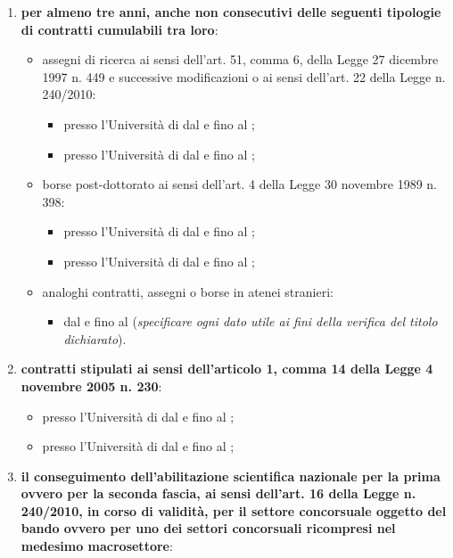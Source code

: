 \documentclass[a4paper,10pt]{article}
\begin{document}
\begin{Form}
\begin{enumerate}
\item \textbf{per almeno tre anni, anche non consecutivi delle seguenti tipologie 
di contratti cumulabili tra loro}:
\begin{itemize}
\item assegni di ricerca ai sensi dell’art. 51, comma 6, della Legge 27 dicembre
 1997 n. 449 e successive modificazioni o ai sensi dell’art. 22 della Legge n. 240/2010:
\begin{itemize}
 \item presso l’Università di \myTextField[4.5cm]{} dal \myTextField{} e fino 
 al \myTextField{};
 \item presso l’Università di \myTextField[4.5cm]{} dal \myTextField{} e fino 
 al \myTextField{};
\end{itemize}
\item borse post-dottorato ai sensi dell’art. 4 della Legge 30 novembre 1989 
n. 398:
\begin{itemize}
 \item presso l’Università di \myTextField[4.5cm]{} dal \myTextField{} e fino 
 al \myTextField{};
 \item presso l’Università di \myTextField[4.5cm]{} dal \myTextField{} e fino 
 al \myTextField{};
\end{itemize}
\item analoghi contratti, assegni o borse in atenei stranieri:
\begin{itemize}
\item dal \myTextField{} e fino al \myTextField{} (\emph{specificare ogni dato 
utile ai fini della verifica del titolo dichiarato}).
\end{itemize}
\end{itemize}
\item \textbf{contratti stipulati ai sensi dell’articolo 1, comma 14 della 
Legge 4 novembre 2005 n. 230}:
\begin{itemize}
 \item presso l’Università di \myTextField[4.5cm]{} dal \myTextField{} e fino 
 al \myTextField{};
 \item presso l’Università di \myTextField[4.5cm]{} dal \myTextField{} e fino 
 al \myTextField{};
\end{itemize}
\item \textbf{il conseguimento dell’abilitazione scientifica nazionale per la 
prima ovvero per la seconda fascia, ai sensi dell’art. 16 della Legge n. 
240/2010, in corso di validità, per il settore concorsuale oggetto del bando 
ovvero per uno dei settori concorsuali ricompresi nel medesimo macrosettore}:


\end{enumerate}
\end{Form}
\end{document}
